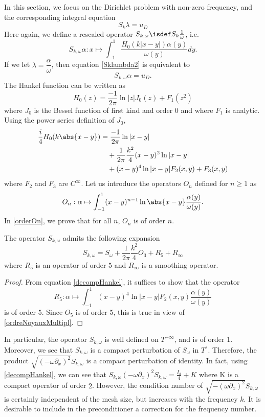 \documentclass[a4paper]{article}
\begin{document}
	In this section, we focus on the Dirichlet problem with non-zero frequency, and the corresponding integral equation 
	\begin{equation}
	S_k \lambda = u_D
	\label{Sklambda2}
	\end{equation}
	Here again, we define a rescaled operator $S_{k,\omega} \isdef S_k \frac{1}{\omega}$, i.e.
	\[S_{k,\omega}\alpha : x \mapsto \int_{-1}^1 \dfrac{H_0(k|x-y|) \alpha(y)}{\omega(y)}dy.\]
	If we let $\lambda = \dfrac{\alpha}{\omega}$, then equation \eqref{Sklambda2} is equivalent to
	\[S_{k,\omega}\alpha = u_D.\]
	The Hankel function can be written as 
	\[H_0(z) = \frac{-1}{2\pi}\ln|z| J_0(z) + F_1(z^2)\]
	where $J_0$ is the Bessel function of first kind and order $0$ and where $F_1$ is analytic. Using the power series definition of $J_0$, 
	\begin{align}
	\begin{split}
	\frac{i}{4}H_0(k \abs{x - y}) &= \frac{-1}{2\pi}\ln |x-y| \label{decompHankel}\\ 
	&\quad + \frac{1}{2\pi} \frac{k^2}{4} (x- y)^2 \ln |x-y|\\
	&\quad + (x-y)^4 \ln|x-y|F_2(x,y) + F_3(x,y)
	\end{split}
	\end{align}
	\noindent where $F_2$ and $F_3$ are $C^{\infty}$. Let us introduce the operators $O_n$ defined for $n \geq 1$ as 
	\[O_n : \alpha \mapsto \int_{-1}^{1}(x-y)^{n-1} \ln\abs{x - y} \frac{\alpha(y)}{\omega(y)}.\]
	In \autoref{orderOn}, we prove that for all $n$, $O_n$ is of order $n$. 
	\begin{Lem}
		The operator $S_{k,\omega}$ admits the following expansion 
		\[ S_{k, \omega} = S_\omega + \frac{1}{2\pi} \frac{k^2}{4} O_3 +  R_5 + R_{\infty}\]
		\label{developpementHankel}
		where $R_5$ is an operator of order $5$ and $R_\infty$ is a smoothing operator.
	\end{Lem}
	\begin{proof}
		From equation \eqref{decompHankel}, it suffices to show that the operator 
		\[R_5 : \alpha \mapsto \int_{-1}^{1} (x-y)^4 \ln|x - y|F_2(x,y)\frac{\alpha(y)}{\omega(y)}\]
		is of order $5$. Since $O_5$ is of order $5$, this is true in view of \autoref{ordreNoyauxMultipl}.
	\end{proof}
	In particular, the operator $S_{k,\omega}$ is well defined on $T^{-\infty}$, and is of order $1$. Moreover, we see that $S_{k,\omega}$ is a compact perturbation of $S_\omega$ in $T^s$. Therefore, the product $\sqrt{(-\omega \partial_x)^2}S_{k,\omega}$ is a compact perturbation of identity. In fact, using \autoref{decompHankel}, we can see that $S_{k,\omega}(- \omega \partial_x)^2 S_{k,\omega} = \frac{I_d}{4} + K$ where K is a compact operator of order $2$. However, the condition number of $\sqrt{-(\omega \partial_x)^2}S_{k,\omega}$ is certainly independent of the mesh size, but increases with the frequency $k$. It is desirable to include in the preconditioner a correction for the frequency number. 
\end{document}
